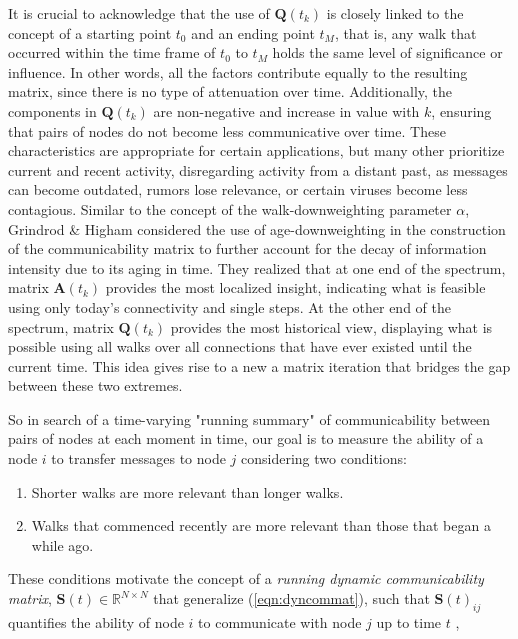 It is crucial to acknowledge that the use of $\mathbf{Q}(t_k)$ is closely linked to the concept of a starting point $t_0$ and an ending point $t_M$, that is, any walk that occurred within the time frame of $t_0$ to $t_M$ holds the same level of significance or influence. In other words, all the factors contribute equally to the resulting matrix, since there is no type of attenuation over time. Additionally, the components in $\mathbf{Q}(t_k)$ are non-negative and increase in value with $k$, ensuring that pairs of nodes do not become less communicative over time. These characteristics are appropriate for certain applications, but many other prioritize current and recent activity, disregarding activity from a distant past, as messages can become outdated, rumors lose relevance, or certain viruses become less contagious. Similar to the concept of the walk-downweighting parameter $\alpha$, Grindrod \& Higham \cite{grindrod2013matrix} considered the use of age-downweighting in the construction of the communicability matrix to further account for the decay of information intensity due to its
aging in time. They realized that at one end of the spectrum, matrix $\mathbf{A}(t_k)$ provides the most localized insight, indicating what is feasible using only today's connectivity and single steps. At the other end of the spectrum, matrix $\mathbf{Q}(t_k)$ provides the most historical view, displaying what is possible using all walks over all connections that have ever existed until the current time. This idea gives rise to a new a matrix iteration that bridges the gap between these two extremes.

So in search of a time-varying "running summary" of communicability between pairs of nodes at each moment in time, our goal is to measure the ability of a node $i$ to transfer messages to node $j$ considering two conditions: 
\begin{enumerate}[label=(\roman*)]
  \item Shorter walks are more relevant than longer walks.
  \item Walks that commenced recently are more relevant than those that began a while ago.
\end{enumerate}

 These conditions motivate the concept of a \textit{running dynamic communicability matrix}, $\mathbf{S}(t)\in\mathbb{R}^{N\times N}$ that generalize (\ref{eqn:dyncommat}), such that $\mathbf{S}(t)_{ij}$ quantifies the ability of node $i$ to communicate with node $j$ up to time $t$ \cite{grindrod2013matrix},
 
